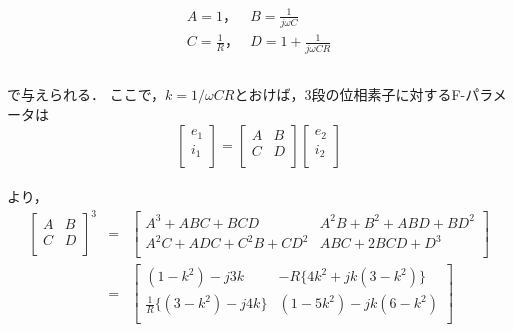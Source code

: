 \documentclass[10pt, a4j, dvipdfmx]{jarticle}
\begin{document}
    \begin{eqnarray*}
        \begin{array}{rr}
            A = 1，& B = \frac{1}{j\omega C} \\
            C = \frac{1}{R}，& D = 1 + \frac{1}{j\omega CR} \\      
        \end{array}
    \end{eqnarray*}
    \\で与えられる．
    ここで，$k = 1/\omega CR$とおけば，3段の位相素子に対するF-パラメータは\\
    \begin{equation*}
        \begin{bmatrix}
            e_1 \\
            i_1 \\
        \end{bmatrix}
        =
        \begin{bmatrix}
            A & B \\
            C & D \\
        \end{bmatrix}
        \begin{bmatrix}
            e_2 \\
            i_2 \\
        \end{bmatrix}
    \end{equation*}
    \\より，\\
    \begin{eqnarray*}
        \begin{bmatrix}
            A & B \\
            C & D \\
        \end{bmatrix}^3
        & = &
        \begin{bmatrix}
            A^3 + ABC + BCD & A^2B + B^2 + ABD + BD^2 \\
            A^2C + ADC + C^2B + CD^2 & ABC + 2BCD + D^3 \\
        \end{bmatrix}\\
        & = &
        \begin{bmatrix}
            (1 - k^2) - j3k & -R\{4k^2 + jk(3 - k^2)\} \\
            \frac{1}{R}\{(3-k^2)-j4k\} & (1-5k^2)-jk(6-k^2) \\
        \end{bmatrix}
    \end{eqnarray*}
\end{document}
